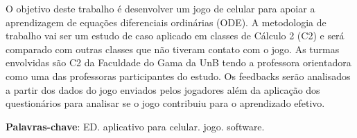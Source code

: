\begin{resumo}

	O objetivo deste trabalho é desenvolver um jogo de celular para apoiar a aprendizagem de equações diferenciais ordinárias (ODE). A metodologia de trabalho vai ser um estudo de caso aplicado em classes de Cálculo 2 (C2) e será comparado com outras classes que não tiveram contato com o jogo. As turmas envolvidas são C2 da Faculdade do Gama da UnB tendo a professora orientadora como uma das professoras participantes do estudo. Os feedbacks serão analisados a partir dos dados do jogo enviados pelos jogadores além da aplicação dos questionários para analisar se o jogo contribuiu para o aprendizado efetivo.
	
\begin{comment}
 Com a qualidade de ensino de matemática baixa e contra os métodos muito
 tradicionais de ensino nas salas de aula, resolveu-se desenvolver um 
 aplicativo para celular (iOS e Android) que seja um jogo para o suporte de 
 ensino de equações diferenciais (ED). Será realizada uma pesquisa descritiva
 para o levantamento bibliográfico das características que deverão estar presentes
 no software para dar auxílio a alunos com TDAH junto de técnicas de gamificação 
 para tentar deixar o aprendizado mais prazeroso.
\end{comment}
  
 \begin{comment}
 O resumo deve ressaltar o objetivo, o método, os resultados e as conclusões 
 do documento. A ordem e a extensão
 destes itens dependem do tipo de resumo (informativo ou indicativo) e do
 tratamento que cada item recebe no documento original. O resumo deve ser
 precedido da referência do documento, com exceção do resumo inserido no
 próprio documento. (\ldots) As palavras-chave devem figurar logo abaixo do
 resumo, antecedidas da expressão Palavras-chave:, separadas entre si por
 ponto e finalizadas também por ponto. O texto pode conter no mínimo 150 e 
 no máximo 500 palavras, é aconselhável que sejam utilizadas 200 palavras. 
 E não se separa o texto do resumo em parágrafos.
 \end{comment}

 \vspace{\onelineskip}
    
 \noindent
 \textbf{Palavras-chave}: ED. aplicativo para celular. jogo. software.
\end{resumo}
